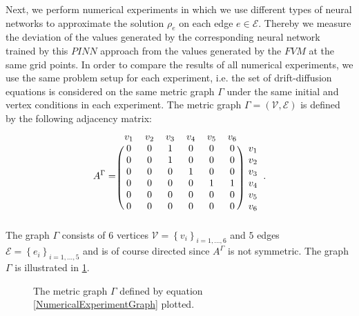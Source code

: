 Next, we perform numerical experiments in which we use different types of neural networks to approximate the solution $\rho_e$ on each edge $e \in \mathcal{E}$. Thereby we measure the deviation of the values generated by the corresponding neural network trained by this $PINN$ approach from the values generated by the $FVM$ at the same grid points. In order to compare the results of all numerical experiments, we use the same problem setup for each experiment, i.e. the set of drift-diffusion equations is considered on the same metric graph $\Gamma$ under the same initial and vertex conditions in each experiment. The metric graph $\Gamma = \left( \mathcal{V}, \mathcal{E} \right)$ is defined by the following adjacency matrix: 
\begin{equation}
    \label{NumericalExperimentGraph}
    A^{\Gamma} = 
    \begin{blockarray}{ccccccc}
        v_1 & v_2 & v_3 & v_4 & v_5 & v_6 \\
        \begin{block}{(cccccc)c}
            0 & 0 & 1 & 0 & 0 & 0 & v_1 \\
            0 & 0 & 1 & 0 & 0 & 0 & v_2 \\
            0 & 0 & 0 & 1 & 0 & 0 & v_3 \\
            0 & 0 & 0 & 0 & 1 & 1 & v_4 \\
            0 & 0 & 0 & 0 & 0 & 0 & v_5 \\
            0 & 0 & 0 & 0 & 0 & 0 & v_6 \\
        \end{block}
    \end{blockarray}.
\end{equation}
The graph $\Gamma$ consists of $6$ vertices $\mathcal{V} = \left\{ v_i \right\}_{i = 1,\ldots, 6}$ and $5$ edges $\mathcal{E} = \left\{ e_i \right\}_{i = 1,\ldots, 5}$ and is of course directed since $A^{\Gamma}$ is not symmetric. The graph $\Gamma$ is illustrated in \cref{fig7}. 
\begin{figure}[H]
    \begin{center}
    \end{center}
    \caption{The metric graph $\Gamma$ defined by equation \cref{NumericalExperimentGraph} plotted.}
    \label{fig7}
\end{figure}
